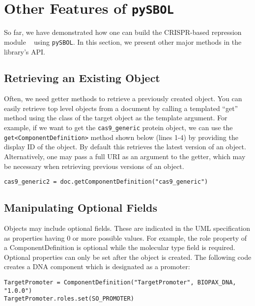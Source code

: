 \section*{Other Features of {\tt pySBOL}}
So far, we have demonstrated how one can build the CRISPR-based repression module ~\cite{kiani2014crispr} using {\tt pySBOL}. In this section, we present other major methods in the library's API. 

\subsection*{Retrieving an Existing Object}
Often, we need getter methods to retrieve a previously created object. You can easily retrieve top level objects from a document by calling a templated ``get'' method using the class of the target object as the template argument. For example, if we want to get the \lstinline+cas9_generic+ protein  object, we can use the \lstinline+get<ComponentDefinition>+ method shown below (lines 1-4) by providing the display ID of the object. By default this retrieves the latest version of an object. Alternatively, one may pass a full URI as an argument to the getter, which may be necessary when retrieving previous versions of an object.

\vspace{\abovedisplayskip}
\begin{minipage}{0.95\textwidth} 
\begin{lstlisting}
cas9_generic2 = doc.getComponentDefinition("cas9_generic")
\end{lstlisting}
\end{minipage}

\subsection*{Manipulating Optional Fields}
Objects may include optional fields. These are indicated in the UML specification as properties having 0 or more possible values. For example, the role property of a ComponentDefinition is optional while the molecular type field is required. Optional properties can only be set after the object is created. The following code creates a DNA component which is designated as a promoter:

\vspace{\abovedisplayskip}
\begin{minipage}{0.95\textwidth} 
\begin{lstlisting}
TargetPromoter = ComponentDefinition("TargetPromoter", BIOPAX_DNA, "1.0.0")
TargetPromoter.roles.set(SO_PROMOTER)
\end{lstlisting}
\end{minipage}

